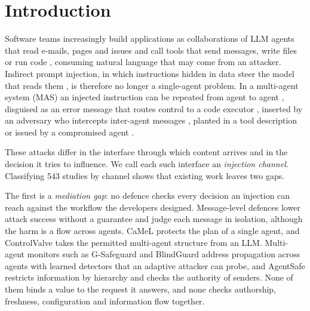 \documentclass[pdflatex,sn-mathphys-num]{sn-jnl}
\theoremstyle{thmstyleone}%
\theoremstyle{thmstyletwo}%
\theoremstyle{thmstylethree}%
\newcommand{\NCorpus}{543}
\begin{document}

\maketitle

\section{Introduction}\label{sec:intro}

Software teams increasingly build applications as collaborations of LLM agents that read e-mails, pages and issues and call tools that send messages, write files or run code \citep{wu2023autogen,guo2024llmmas}, consuming natural language that may come from an attacker. Indirect prompt injection, in which instructions hidden in data steer the model that reads them \citep{greshake2023indirect,perez2022ignore,liu2024formalizing}, is therefore no longer a single-agent problem. In a multi-agent system (MAS) an injected instruction can be repeated from agent to agent \citep{lee2024promptinfection}, disguised as an error message that routes control to a code executor \citep{triedman2025mas}, inserted by an adversary who intercepts inter-agent messages \citep{he2025aitm}, planted in a tool description \citep{invariant2025toolpoisoning} or issued by a compromised agent \citep{kavathekar2025tamas}.

These attacks differ in the interface through which content arrives and in the decision it tries to influence. We call each such interface an \emph{injection channel}. Classifying \NCorpus{} studies by channel shows that existing work leaves two gaps.

The first is a \emph{mediation gap}: no defence checks every decision an injection can reach against the workflow the developers designed. Message-level defences \citep{inan2023llamaguard,hines2024spotlighting,wallace2024hierarchy,chen2025struq} lower attack success without a guarantee and judge each message in isolation, although the harm is a flow across agents. CaMeL \citep{debenedetti2025camel} protects the plan of a single agent, and ControlValve \citep{jha2025controlvalve} takes the permitted multi-agent structure from an LLM. Multi-agent monitors such as G-Safeguard \citep{Wang2025GSafeguardATAW} and BlindGuard \citep{Miao2025BlindGuardSLAV} address propagation across agents with learned detectors that an adaptive attacker can probe, and AgentSafe \citep{Mao2025AgentSafeSLY} restricts information by hierarchy and checks the authority of senders. None of them binds a value to the request it answers, and none checks authorship, freshness, configuration and information flow together.
\end{document}
